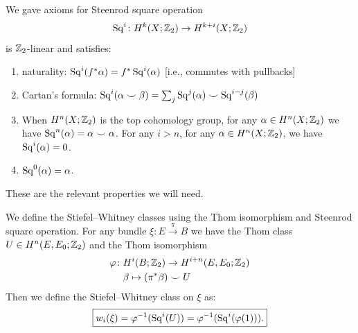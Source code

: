 
\lecture{}

\begin{recall}
We gave axioms for Steenrod square operation 
\begin{equation}
\operatorname{Sq}^{i}\colon H^{k}(X;\mathbb{Z}_{2})\to H^{k+i}(X;\mathbb{Z}_{2})
\end{equation}
is $\mathbb{Z}_{2}$-linear and satisfies:
\begin{enumerate}
\item naturality: $\operatorname{Sq}^{i}(f^{*}\alpha)=f^{*}\operatorname{Sq}^{i}(\alpha)$ [i.e.,
  commutes with pullbacks]
\item Cartan's formula: $\operatorname{Sq}^{i}(\alpha\smile\beta)=\sum_{j}\operatorname{Sq}^{j}(\alpha)\smile\operatorname{Sq}^{i-j}(\beta)$
\item When $H^{n}(X;\mathbb{Z}_{2})$ is the top cohomology group, for any
  $\alpha\in H^{n}(X;\mathbb{Z}_{2})$ we have $\operatorname{Sq}^{n}(\alpha)=\alpha\smile\alpha$.
  For any $i>n$, for any $\alpha\in H^{n}(X;\mathbb{Z}_{2})$, we have $\operatorname{Sq}^{i}(\alpha)=0$.
\item $\operatorname{Sq}^{0}(\alpha)=\alpha$.
\end{enumerate}
These are the relevant properties we will need.
\end{recall}

\begin{node}
We define the Stiefel--Whitney classes using the Thom isomorphism and
Steenrod square operation. For any bundle $\xi\colon E\xrightarrow{\pi}B$
we have the Thom class $U\in H^{n}(E,E_{0};\mathbb{Z}_{2})$ and the Thom
isomorphism
\begin{align}
  \varphi\colon & H^{i}(B;\mathbb{Z}_{2})\to H^{i+n}(E,E_{0};\mathbb{Z}_{2})\\
  &\beta\mapsto(\pi^{*}\beta)\smile U\nonumber
\end{align}
Then we define the Stiefel--Whitney class on $\xi$ as:
\begin{equation}
\boxed{w_{i}(\xi)=\varphi^{-1}(\operatorname{Sq}^{i}(U))=\varphi^{-1}(\operatorname{Sq}^{i}(\varphi(1))).}
\end{equation}
\end{node}

